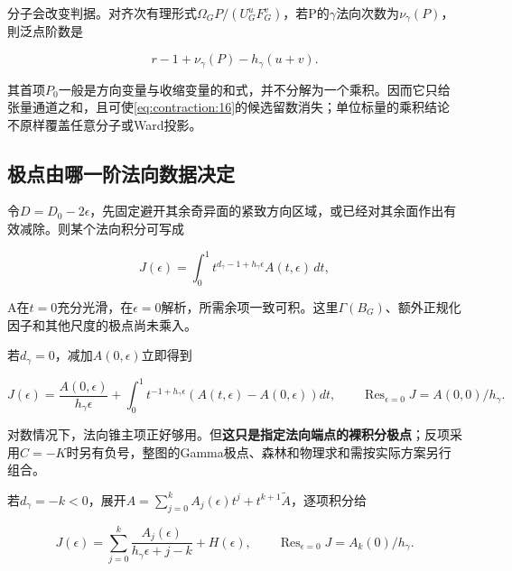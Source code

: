 \documentclass[11pt,a4paper,oneside]{ctexart}
\theoremstyle{cnplain}
\theoremstyle{definition}
\theoremstyle{remark}
\numberwithin{equation}{section}
\begin{document}
分子会改变判据。对齐次有理形式\(\Omega _G P/(U_G^u F_G^v)\)，若P的\(\gamma \)法向次数为\(\nu _\gamma (P)\)，則泛点阶数是

\begin{equation}
r-1+\nu_\gamma(P)-h_\gamma(u+v).                 \label{eq:contraction:17}
\end{equation}

其首项\(P_0\)一般是方向变量与收缩变量的和式，并不分解为一个乘积。因而它只给张量通道之和，且可使\eqref{eq:contraction:16}的候选留数消失；单位标量的乘积结论不原样覆盖任意分子或Ward投影。


\subsection{极点由哪一阶法向数据决定}\label{sec:contraction:5}

令\(D=D_0- 2\epsilon \)，先固定避开其余奇异面的紧致方向区域，或已经对其余面作出有效减除。则某个法向积分可写成

\begin{equation}
J(\epsilon)=\int_0^1 t^{d_\gamma-1+h_\gamma\epsilon}
                                A(t,\epsilon)\,dt,             \label{eq:contraction:18}
\end{equation}

A在\(t=0\)充分光滑，在\(\epsilon =0\)解析，所需余项一致可积。这里\(\Gamma (B_G)\)、额外正规化因子和其他尺度的极点尚未乘入。

若\(d_\gamma =0\)，减加\(A(0,\epsilon )\)立即得到

\begin{equation}
J(\epsilon)=\frac{A(0,\epsilon)}{h_\gamma\epsilon}
      +\int_0^1 t^{-1+h_\gamma\epsilon}(A(t,\epsilon)-A(0,\epsilon))dt,
 \qquad\operatorname{Res}_{\epsilon=0}J=A(0,0)/h_\gamma.          \label{eq:contraction:19}
\end{equation}

对数情况下，法向锥主项正好够用。但\textbf{这只是指定法向端点的裸积分极点}；反项采用\(C=- K\)时另有负号，整图的Gamma极点、森林和物理求和需按实际方案另行组合。

若\(d_\gamma =- k<0\)，展开\(A=\sum _{j=0}^k A_j(\epsilon )t^j+t^{k+1}\widetilde A\)，逐项积分给

\begin{equation}
J(\epsilon)=\sum_{j=0}^k\frac{A_j(\epsilon)}{h_\gamma\epsilon+j-k}
                  +H(\epsilon),\qquad
 \operatorname{Res}_{\epsilon=0}J=A_k(0)/h_\gamma.                \label{eq:contraction:20}
\end{equation}
\end{document}
